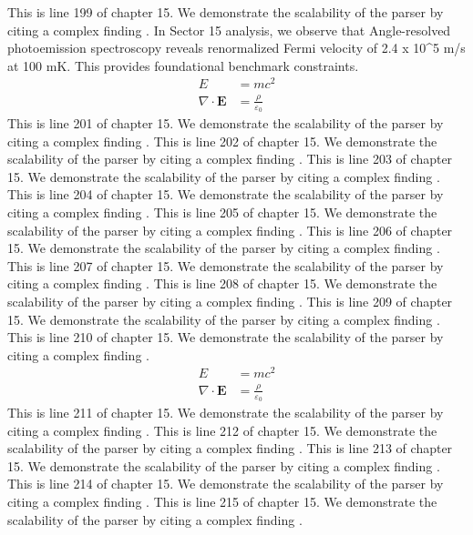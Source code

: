 This is line 199 of chapter 15. We demonstrate the scalability of the parser by citing a complex finding \cite{ref15_199}.
In Sector 15 analysis, we observe that Angle-resolved photoemission spectroscopy reveals renormalized Fermi velocity of 2.4 x 10^5 m/s at 100 mK. This provides foundational benchmark constraints.
\begin{align*}
  E &= mc^2 \\
  \nabla \cdot \mathbf{E} &= \frac{\rho}{\varepsilon_0}
\end{align*}
This is line 201 of chapter 15. We demonstrate the scalability of the parser by citing a complex finding \cite{ref15_201}.
This is line 202 of chapter 15. We demonstrate the scalability of the parser by citing a complex finding \cite{ref15_202}.
This is line 203 of chapter 15. We demonstrate the scalability of the parser by citing a complex finding \cite{ref15_203}.
This is line 204 of chapter 15. We demonstrate the scalability of the parser by citing a complex finding \cite{ref15_204}.
This is line 205 of chapter 15. We demonstrate the scalability of the parser by citing a complex finding \cite{ref15_205}.
This is line 206 of chapter 15. We demonstrate the scalability of the parser by citing a complex finding \cite{ref15_206}.
This is line 207 of chapter 15. We demonstrate the scalability of the parser by citing a complex finding \cite{ref15_207}.
This is line 208 of chapter 15. We demonstrate the scalability of the parser by citing a complex finding \cite{ref15_208}.
This is line 209 of chapter 15. We demonstrate the scalability of the parser by citing a complex finding \cite{ref15_209}.
This is line 210 of chapter 15. We demonstrate the scalability of the parser by citing a complex finding \cite{ref15_210}.
\begin{align*}
  E &= mc^2 \\
  \nabla \cdot \mathbf{E} &= \frac{\rho}{\varepsilon_0}
\end{align*}
This is line 211 of chapter 15. We demonstrate the scalability of the parser by citing a complex finding \cite{ref15_211}.
This is line 212 of chapter 15. We demonstrate the scalability of the parser by citing a complex finding \cite{ref15_212}.
This is line 213 of chapter 15. We demonstrate the scalability of the parser by citing a complex finding \cite{ref15_213}.
This is line 214 of chapter 15. We demonstrate the scalability of the parser by citing a complex finding \cite{ref15_214}.
This is line 215 of chapter 15. We demonstrate the scalability of the parser by citing a complex finding \cite{ref15_215}.
